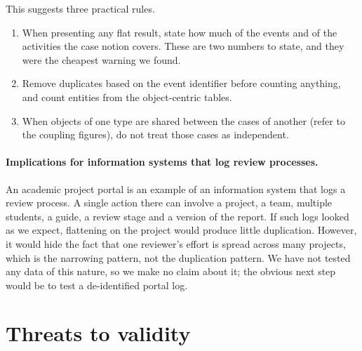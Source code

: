 \documentclass[pdflatex,sn-mathphys-num]{sn-jnl}
\begin{document}
This suggests three practical rules.

\begin{enumerate}
\item When presenting any flat result, state how much of the events and of the activities the case notion covers. These are two numbers to state, and they were the cheapest warning we found.
\item Remove duplicates based on the event identifier before counting anything, and count entities from the object-centric tables.
\item When objects of one type are shared between the cases of another (refer to the coupling figures), do not treat those cases as independent.
\end{enumerate}

\paragraph{Implications for information systems that log review processes.} An academic project portal is an example of an information system that logs a review process. A single action there can involve a project, a team, multiple students, a guide, a review stage and a version of the report. If such logs looked as we expect, flattening on the project would produce little duplication. However, it would hide the fact that one reviewer's effort is spread across many projects, which is the narrowing pattern, not the duplication pattern. We have not tested any data of this nature, so we make no claim about it; the obvious next step would be to test a de-identified portal log.

\section{Threats to validity}\label{sec:threats}
\end{document}
